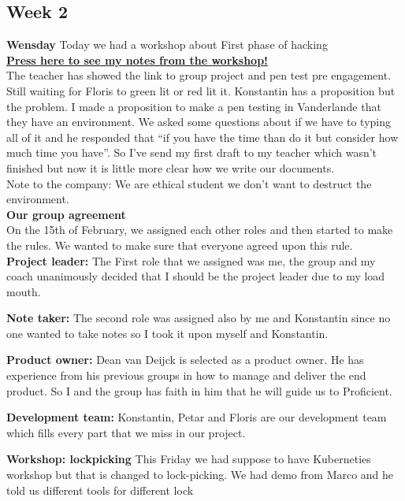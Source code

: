 \documentclass[12pt, letterpaper]{article}
\begin{document}
\subsection{Week 2}
\textbf{Wensday}
Today we had a workshop about First phase of hacking 
\hfill\break
\\
\hyperref[workshop:week2]{\textbf{Press here to see my notes from the workshop!}}
\hfill\break
\\
The teacher has showed the link to group project and pen test pre engagement. Still waiting for Floris to green lit or red lit it. Konstantin has a proposition but the problem. I made a proposition to make a pen testing in Vanderlande that they have an environment. We asked some questions about if we have to typing all of it and he responded that “if you have the time than do it but consider how much time you have”. So I’ve send my first draft to my teacher which wasn’t finished but now it is little more clear how we write our documents.
\hfill\break
\\
Note to the company:
We are ethical student we don’t want to destruct the environment.
\hfill\break
\\
\textbf{Our group agreement}
\hfill\break
\\
On the 15th of February, we assigned each other roles and then started to make the rules. We wanted to make sure that everyone agreed upon this rule.
\hfill\break 
\\
\textbf{Project leader:}
\hfill\break
The First role that we assigned was me, the group and my coach unanimously decided that I should be the project leader due to my load mouth.

\textbf{Note taker:}
\hfill\break
The second role was assigned also by me and Konstantin since no one wanted to take notes so I took it upon myself and Konstantin.

\textbf{Product owner:}
\hfill\break
Dean van Deijck is selected as a product owner. He has experience from his previous groups in how to manage and deliver the end product. So I and the group has faith in him that he will guide us to Proficient.

\textbf{Development team:}
\hfill\break
Konstantin, Petar and Floris are our development team which fills every part that we miss in our project.

\hfill\break
\hfill\break
\textbf{Workshop: lockpicking}
This Friday we had suppose to have Kuberneties workshop but that is changed to lock-picking. We had demo from Marco and he told us different tools for different lock 
\end{document}

